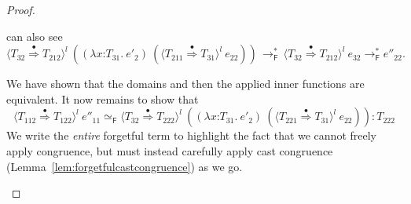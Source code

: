 \documentclass[9pt]{extarticle}
\newcommand{\ottnt}[1]{\mathit{#1}}
\begin{document}
{\begin{lemma}
\begin{proof}
{\begin{itemize}
\begin{itemize}
        can also see \[  \langle  \ottnt{T_{{\mathrm{32}}}}  \mathord{ \overset{\bullet}{\Rightarrow} }  \ottnt{T_{{\mathrm{212}}}}  \rangle^{ \ottnt{l} } ~   (   (  \lambda \mathit{x} \mathord{:} \ottnt{T_{{\mathrm{31}}}} .~  \ottnt{e'_{{\mathrm{2}}}}  )  ~  (  \langle  \ottnt{T_{{\mathrm{211}}}}  \mathord{ \overset{\bullet}{\Rightarrow} }  \ottnt{T_{{\mathrm{31}}}}  \rangle^{ \ottnt{l} } ~  \ottnt{e_{{\mathrm{22}}}}  )   )   \,  \longrightarrow ^{*}_{  \mathsf{F}  }  \,  \langle  \ottnt{T_{{\mathrm{32}}}}  \mathord{ \overset{\bullet}{\Rightarrow} }  \ottnt{T_{{\mathrm{212}}}}  \rangle^{ \ottnt{l} } ~  \ottnt{e_{{\mathrm{32}}}}   \longrightarrow ^{*}_{  \mathsf{F}  }  \ottnt{e''_{{\mathrm{22}}}}. \]

        We have shown that the domains and then the applied inner
        functions are equivalent.  It now remains to show that
\[   \langle  \ottnt{T_{{\mathrm{112}}}}  \mathord{ \overset{\bullet}{\Rightarrow} }  \ottnt{T_{{\mathrm{122}}}}  \rangle^{ \ottnt{l} } ~  \ottnt{e''_{{\mathrm{11}}}}    \simeq _{  \mathsf{F}  }   \langle  \ottnt{T_{{\mathrm{32}}}}  \mathord{ \overset{\bullet}{\Rightarrow} }  \ottnt{T_{{\mathrm{222}}}}  \rangle^{ \ottnt{l} } ~   (   (  \lambda \mathit{x} \mathord{:} \ottnt{T_{{\mathrm{31}}}} .~  \ottnt{e'_{{\mathrm{2}}}}  )  ~  (  \langle  \ottnt{T_{{\mathrm{221}}}}  \mathord{ \overset{\bullet}{\Rightarrow} }  \ottnt{T_{{\mathrm{31}}}}  \rangle^{ \ottnt{l} } ~  \ottnt{e_{{\mathrm{22}}}}  )   )    :  \ottnt{T_{{\mathrm{222}}}}  \]
We write the \textit{entire} forgetful term to highlight the
        fact that we cannot freely apply congruence, but must instead
        carefully apply cast congruence
        (Lemma~\ref{lem:forgetfulcastcongruence}) as we go.
        

\end{itemize}
\end{itemize}}
\end{proof}
\end{lemma}}
\end{document}
